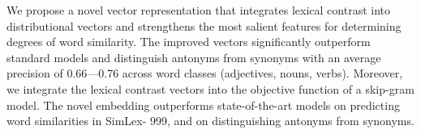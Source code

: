 We propose a novel vector representation that integrates lexical contrast into distributional vectors and strengthens the most salient features for determining degrees of word similarity. The improved vectors significantly outperform standard models and distinguish antonyms from synonyms with an average precision of 0.66---0.76 across word classes (adjectives, nouns, verbs). Moreover, we integrate the lexical contrast vectors into the objective function of a skip-gram model. The novel embedding outperforms state-of-the-art models on predicting word similarities in SimLex- 999, and on distinguishing antonyms from synonyms.
